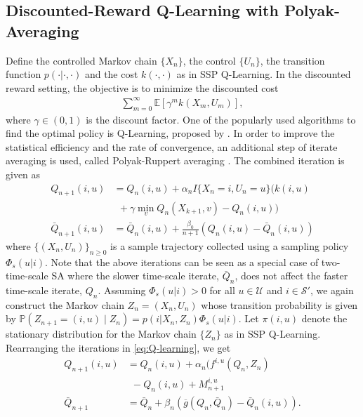 \documentclass[letterpaper, 10 pt, conference]{ieeeconf}  %
\theoremstyle{definition}
\theoremstyle{plain}
\newcommand{\barg}{\overline{g}}
\newcommand{\Scal}{\mathcal{S}}
\newcommand{\UU}{\mathcal{U}}
\newcommand{\PP}{\mathbb{P}}
\begin{document}
\subsection{Discounted-Reward Q-Learning with Polyak-Averaging}\label{subsec:Q-learning}
Define the controlled Markov chain $\{X_n\}$, the control $\{U_n\}$, the transition function $p(\cdot|\cdot,\cdot)$ and the cost $k(\cdot,\cdot)$ as in SSP Q-Learning. In the discounted reward setting, the objective is to minimize the discounted cost 
\begin{align*}
    \sum_{m=0}^{\infty}\mathbb{E}[\gamma^mk(X_m,U_m)],
\end{align*}
where $\gamma\in(0,1)$ is the discount factor. One of the popularly used algorithms to find the optimal policy is Q-Learning, proposed by \cite{watkins1992}. In order to improve the statistical efficiency and the rate of convergence, an additional step of iterate averaging is used, called Polyak-Ruppert averaging \cite{ruppert1988efficient, polyak1992acceleration}. The combined iteration is given as
\begin{subequations}\label{eq:Q-learning}
    \begin{align}
        Q_{n+1}(i,u)&=Q_n(i,u)+\alpha_nI\{X_n=i, U_n=u\}\Big(k(i,u)\nonumber\\
        &~~+\gamma\min_{v}Q_n(X_{k+1}, v)-Q_n(i,u)\Big)\\
        \bar{Q}_{n+1}(i,u)&=\bar{Q}_n(i,u)+\frac{\beta_0}{n+1}\left(Q_n(i,u)-\bar{Q}_n(i,u)\right)
    \end{align}
\end{subequations}
where $\{(X_n, U_n)\}_{n\geq 0}$ is a sample trajectory collected using a sampling policy $\Phi_s(u|i)$. Note that the above iterations can be seen as a special case of two-time-scale SA where the slower time-scale iterate, $\bar{Q}_n$, does not affect the faster time-scale iterate, $Q_n$. Assuming $\Phi_s(u|i)>0$ for all $u\in \UU$ and $i\in \Scal'$, we again construct the Markov chain $Z_n=(X_n, U_n)$ whose transition probability is given by $\PP(Z_{n+1}=(i,u)\mid Z_n)=p(i|X_n,Z_n)\Phi_s(u|i)$. Let $\pi(i,u)$ denote the stationary distribution for the Markov chain $\{Z_n\}$ as in SSP Q-Learning. Rearranging the iterations in \eqref{eq:Q-learning}, we get
\begin{subequations}\label{eq:re Q-learning}
    \begin{align}
        Q_{n+1}(i,u)&=Q_n(i,u)+\alpha_n(f^{i,u}(Q_n, Z_n)\nonumber\\
        &~~-Q_n(i,u)+M_{n+1}^{i,u}\\
        \bar{Q}_{n+1}&=\bar{Q}_n+\beta_n(\barg(Q_n,\bar{Q}_n)-\bar{Q}_n(i,u)).
    \end{align}
\end{subequations}
\end{document}
